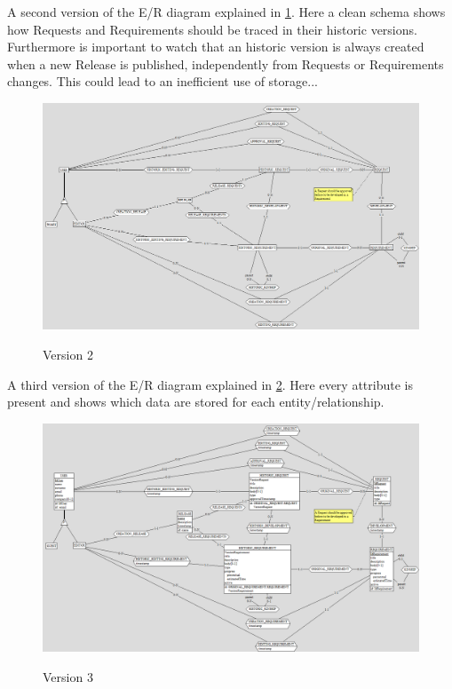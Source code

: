\documentclass[12pt, a4paper]{report}
\begin{document}
A second version of the E/R diagram explained in \ref{fig:ER_v2}.
Here a clean schema shows how Requests and Requirements should be traced in their historic versions.
Furthermore is important to watch that an historic version is always created when a new Release is published, independently from
Requests or Requirements changes.
This could lead to an inefficient use of storage...

\begin{figure}[H]
\centering
\caption{Version 2}
\includegraphics[width=\textwidth]{E-R conceptual v2}
\label{fig:ER_v2}
\end{figure}

A third version of the E/R diagram explained in \ref{fig:ER_v3}.
Here every attribute is present and shows which data are stored for each entity/relationship.

\begin{figure}[H]
\centering
\caption{Version 3}
\includegraphics[width=\textwidth]{E-R conceptual v3}
\label{fig:ER_v3}
\end{figure}
\end{document}
